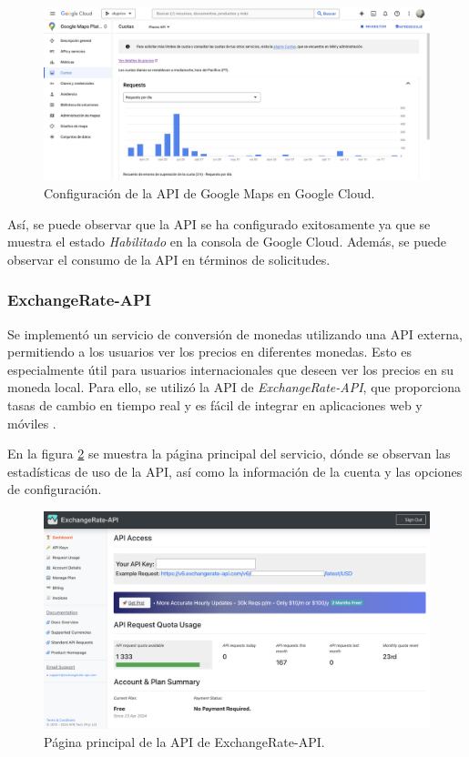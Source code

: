 \begin{figure}[H]
    \centering
    \includegraphics[width=1.0\textwidth]{imagenes/05-implementacion/despliegue/google-maps-api.png}
    \caption{Configuración de la API de Google Maps en Google Cloud.}
    \label{fig:google-maps-api}
\end{figure}

Así, se puede observar que la API se ha configurado exitosamente ya que se muestra
el estado \textit{Habilitado} en la consola de Google Cloud. Además, se puede
observar el consumo de la API en términos de solicitudes.

\subsubsection{ExchangeRate-API}
Se implementó un servicio de conversión de monedas utilizando una API externa,
permitiendo a los usuarios ver los precios en diferentes monedas. Esto es
especialmente útil para usuarios internacionales que deseen ver los precios en
su moneda local. Para ello, se utilizó la API de \textit{ExchangeRate-API}, que
proporciona tasas de cambio en tiempo real y es fácil de integrar en aplicaciones
web y móviles \cite{exchangerate_api}.

En la figura \ref{fig:exchange-rate-api} se muestra la página principal del servicio,
dónde se observan las estadísticas de uso de la API, así como la información de la
cuenta y las opciones de configuración.

\begin{figure}[H]
    \centering
    \includegraphics[width=1.0\textwidth]{imagenes/05-implementacion/despliegue/exchangerate-api.png}
    \caption{Página principal de la API de ExchangeRate-API.}
    \label{fig:exchange-rate-api}
\end{figure}

